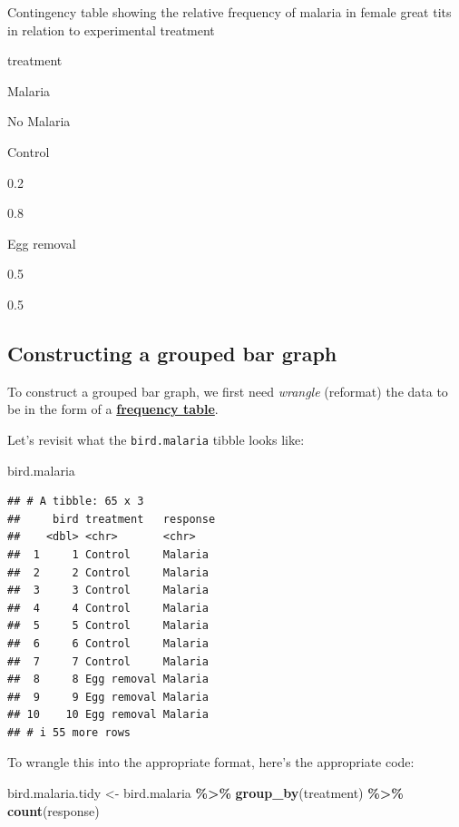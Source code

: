 \documentclass[
]{book}
\newenvironment{Shaded}{\begin{snugshade}}{\end{snugshade}}
\newcommand{\FunctionTok}[1]{\textcolor[rgb]{0.13,0.29,0.53}{\textbf{#1}}}
\newcommand{\NormalTok}[1]{#1}
\newcommand{\OtherTok}[1]{\textcolor[rgb]{0.56,0.35,0.01}{#1}}
\newcommand{\SpecialCharTok}[1]{\textcolor[rgb]{0.81,0.36,0.00}{\textbf{#1}}}
\begin{document}
\label{tab:vismalariaprop}Contingency table showing the relative frequency of malaria in female great tits in relation to experimental treatment

treatment

Malaria

No Malaria

Control

0.2

0.8

Egg removal

0.5

0.5

\subsection{Constructing a grouped bar graph}\label{grouped_bar_graphs}

To construct a grouped bar graph, we first need \emph{wrangle} (reformat) the data to be in the form of a \hyperref[vis_cat_freq_table]{\textbf{frequency table}}.

Let's revisit what the \texttt{bird.malaria} tibble looks like:

\begin{Shaded}
\begin{Highlighting}[]
\NormalTok{bird.malaria}
\end{Highlighting}
\end{Shaded}

\begin{verbatim}
## # A tibble: 65 x 3
##     bird treatment   response
##    <dbl> <chr>       <chr>   
##  1     1 Control     Malaria 
##  2     2 Control     Malaria 
##  3     3 Control     Malaria 
##  4     4 Control     Malaria 
##  5     5 Control     Malaria 
##  6     6 Control     Malaria 
##  7     7 Control     Malaria 
##  8     8 Egg removal Malaria 
##  9     9 Egg removal Malaria 
## 10    10 Egg removal Malaria 
## # i 55 more rows
\end{verbatim}

To wrangle this into the appropriate format, here's the appropriate code:

\begin{Shaded}
\begin{Highlighting}[]
\NormalTok{bird.malaria.tidy }\OtherTok{\textless{}{-}}\NormalTok{ bird.malaria }\SpecialCharTok{\%\textgreater{}\%}
  \FunctionTok{group\_by}\NormalTok{(treatment) }\SpecialCharTok{\%\textgreater{}\%}
  \FunctionTok{count}\NormalTok{(response)}
\end{Highlighting}
\end{Shaded}
\end{document}

